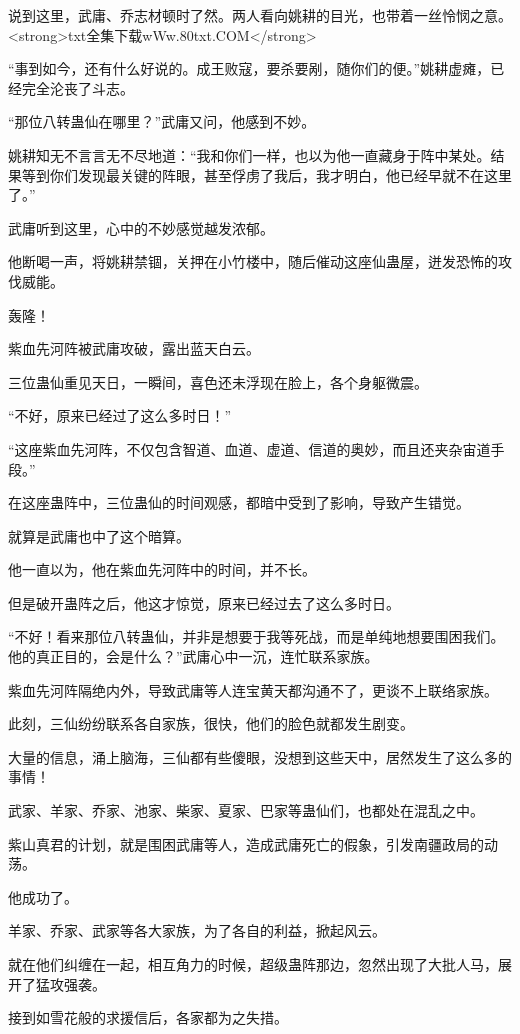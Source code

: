 \begin{this_body}
说到这里，武庸、乔志材顿时了然。两人看向姚耕的目光，也带着一丝怜悯之意。<strong>txt全集下载wWw.80txt.COM</strong>

“事到如今，还有什么好说的。成王败寇，要杀要剐，随你们的便。”姚耕虚瘫，已经完全沦丧了斗志。

“那位八转蛊仙在哪里？”武庸又问，他感到不妙。

姚耕知无不言言无不尽地道：“我和你们一样，也以为他一直藏身于阵中某处。结果等到你们发现最关键的阵眼，甚至俘虏了我后，我才明白，他已经早就不在这里了。”

武庸听到这里，心中的不妙感觉越发浓郁。

他断喝一声，将姚耕禁锢，关押在小竹楼中，随后催动这座仙蛊屋，迸发恐怖的攻伐威能。

轰隆！

紫血先河阵被武庸攻破，露出蓝天白云。

三位蛊仙重见天日，一瞬间，喜色还未浮现在脸上，各个身躯微震。

“不好，原来已经过了这么多时日！”

“这座紫血先河阵，不仅包含智道、血道、虚道、信道的奥妙，而且还夹杂宙道手段。”

在这座蛊阵中，三位蛊仙的时间观感，都暗中受到了影响，导致产生错觉。

就算是武庸也中了这个暗算。

他一直以为，他在紫血先河阵中的时间，并不长。

但是破开蛊阵之后，他这才惊觉，原来已经过去了这么多时日。

“不好！看来那位八转蛊仙，并非是想要于我等死战，而是单纯地想要围困我们。他的真正目的，会是什么？”武庸心中一沉，连忙联系家族。

紫血先河阵隔绝内外，导致武庸等人连宝黄天都沟通不了，更谈不上联络家族。

此刻，三仙纷纷联系各自家族，很快，他们的脸色就都发生剧变。

大量的信息，涌上脑海，三仙都有些傻眼，没想到这些天中，居然发生了这么多的事情！

武家、羊家、乔家、池家、柴家、夏家、巴家等蛊仙们，也都处在混乱之中。

紫山真君的计划，就是围困武庸等人，造成武庸死亡的假象，引发南疆政局的动荡。

他成功了。

羊家、乔家、武家等各大家族，为了各自的利益，掀起风云。

就在他们纠缠在一起，相互角力的时候，超级蛊阵那边，忽然出现了大批人马，展开了猛攻强袭。

接到如雪花般的求援信后，各家都为之失措。


\end{this_body}
